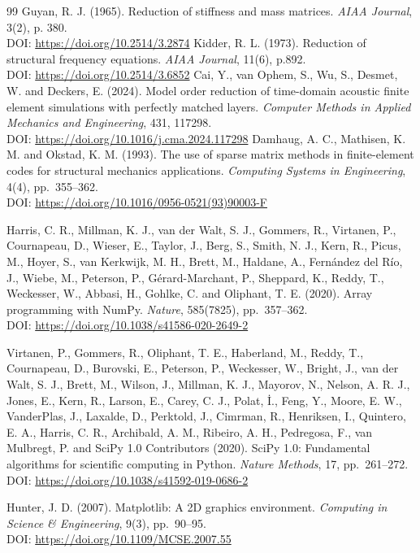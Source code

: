 \documentclass{jors}
\begin{document}
\begin{thebibliography}{99}
Guyan, R. J. (1965).  
Reduction of stiffness and mass matrices.  
\textit{AIAA Journal}, 3(2), p. 380.\\
DOI: \url{https://doi.org/10.2514/3.2874}
Kidder, R. L. (1973).  
Reduction of structural frequency equations.  
\textit{AIAA Journal}, 11(6), p.892.\\
DOI: \url{https://doi.org/10.2514/3.6852}
Cai, Y., van Ophem, S., Wu, S., Desmet, W. and Deckers, E. (2024).  
Model order reduction of time-domain acoustic finite element simulations with perfectly matched layers.  
\textit{Computer Methods in Applied Mechanics and Engineering}, 431, 117298.\\
DOI: \url{https://doi.org/10.1016/j.cma.2024.117298}
Damhaug, A. C., Mathisen, K. M. and Okstad, K. M. (1993).  
The use of sparse matrix methods in finite-element codes for structural mechanics applications.  
\textit{Computing Systems in Engineering}, 4(4), pp.~355--362.\\
DOI: \url{https://doi.org/10.1016/0956-0521(93)90003-F}

Harris, C. R., Millman, K. J., van der Walt, S. J., Gommers, R., Virtanen, P.,
Cournapeau, D., Wieser, E., Taylor, J., Berg, S., Smith, N. J., Kern, R.,
Picus, M., Hoyer, S., van Kerkwijk, M. H., Brett, M., Haldane, A.,
Fern{\'a}ndez del R{\'i}o, J., Wiebe, M., Peterson, P., G{\'e}rard-Marchant, P.,
Sheppard, K., Reddy, T., Weckesser, W., Abbasi, H., Gohlke, C. and Oliphant, T. E. (2020).
Array programming with NumPy.
\textit{Nature}, 585(7825), pp.~357--362.\\
DOI: \url{https://doi.org/10.1038/s41586-020-2649-2}

Virtanen, P., Gommers, R., Oliphant, T. E., Haberland, M., Reddy, T.,
Cournapeau, D., Burovski, E., Peterson, P., Weckesser, W., Bright, J.,
van der Walt, S. J., Brett, M., Wilson, J., Millman, K. J., Mayorov, N.,
Nelson, A. R. J., Jones, E., Kern, R., Larson, E., Carey, C. J.,
Polat, {\.I}., Feng, Y., Moore, E. W., VanderPlas, J., Laxalde, D.,
Perktold, J., Cimrman, R., Henriksen, I., Quintero, E. A., Harris, C. R.,
Archibald, A. M., Ribeiro, A. H., Pedregosa, F., van Mulbregt, P. and
SciPy 1.0 Contributors (2020).  
SciPy 1.0: Fundamental algorithms for scientific computing in Python.  
\textit{Nature Methods}, 17, pp.~261--272.\\
DOI: \url{https://doi.org/10.1038/s41592-019-0686-2}

Hunter, J. D. (2007).  
Matplotlib: A 2D graphics environment.  
\textit{Computing in Science \& Engineering}, 9(3), pp.~90--95.\\
DOI: \url{https://doi.org/10.1109/MCSE.2007.55}


\end{thebibliography}
\end{document}
